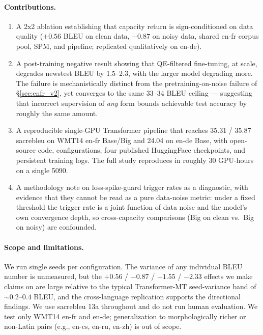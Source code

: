 \paragraph{Contributions.}
\begin{enumerate}
\item A 2x2 ablation establishing that capacity return is sign-conditioned on data quality ($+0.56$ BLEU on clean data, $-0.87$ on noisy data, shared en-fr corpus pool, SPM, and pipeline; replicated qualitatively on en-de).
\item A post-training negative result showing that QE-filtered fine-tuning, at scale, degrades newstest BLEU by 1.5--2.3, with the larger model degrading more. The failure is mechanistically distinct from the pretraining-on-noise failure of \S\ref{sec:enfr_v2}, yet converges to the same 33--34 BLEU ceiling --- suggesting that incorrect supervision of \emph{any} form bounds achievable test accuracy by roughly the same amount.
\item A reproducible single-GPU Transformer pipeline that reaches 35.31 / 35.87 sacrebleu on WMT14 en-fr Base/Big and 24.04 on en-de Base, with open-source code, configurations, four published HuggingFace checkpoints, and persistent training logs. The full study reproduces in roughly 30 GPU-hours on a single 5090.
\item A methodology note on loss-spike-guard trigger rates as a diagnostic, with evidence that they cannot be read as a pure data-noise metric: under a fixed threshold the trigger rate is a joint function of data noise and the model's own convergence depth, so cross-capacity comparisons (Big on clean vs.\ Big on noisy) are confounded.
\end{enumerate}

\paragraph{Scope and limitations.}
We run single seeds per configuration. The variance of any individual BLEU number is unmeasured, but the $+0.56$ / $-0.87$ / $-1.55$ / $-2.33$ effects we make claims on are large relative to the typical Transformer-MT seed-variance band of ${\sim}0.2$--$0.4$ BLEU, and the cross-language replication supports the directional findings. We use sacrebleu 13a throughout and do not run human evaluation. We test only WMT14 en-fr and en-de; generalization to morphologically richer or non-Latin pairs (e.g., en-cs, en-ru, en-zh) is out of scope.

